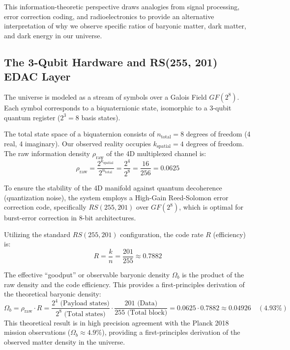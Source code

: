 This information-theoretic perspective draws analogies from signal processing, error correction coding, and radioelectronics to provide an alternative interpretation of why we observe specific ratios of baryonic matter, dark matter, and dark energy in our universe.

\subsection{The 3-Qubit Hardware and RS(255, 201) EDAC Layer}

The universe is modeled as a stream of symbols over a Galois Field $GF(2^8)$. Each symbol corresponds to a biquaternionic state, isomorphic to a 3-qubit quantum register ($2^3=8$ basis states). 

The total state space of a biquaternion consists of $n_{\text{total}} = 8$ degrees of freedom (4 real, 4 imaginary). Our observed reality occupies $k_{\text{spatial}} = 4$ degrees of freedom. The raw information density $\rho_{\text{raw}}$ of the 4D multiplexed channel is:
\begin{equation}
\rho_{\text{raw}} = \frac{2^{k_{\text{spatial}}}}{2^{n_{\text{total}}}} = \frac{2^4}{2^8} = \frac{16}{256} = 0.0625
\end{equation}

To ensure the stability of the 4D manifold against quantum decoherence (quantization noise), the system employs a High-Gain Reed-Solomon error correction code, specifically $RS(255, 201)$ over $GF(2^8)$, which is optimal for burst-error correction in 8-bit architectures. 

Utilizing the standard $RS(255, 201)$ configuration, the code rate $R$ (efficiency) is:
\begin{equation}
R = \frac{k}{n} = \frac{201}{255} \approx 0.7882
\end{equation}

The effective ``goodput'' or observable baryonic density $\Omega_b$ is the product of the raw density and the code efficiency. This provides a first-principles derivation of the theoretical baryonic density:
\begin{equation}
\Omega_b = \rho_{\text{raw}} \cdot R = \frac{2^4 \text{ (Payload states)}}{2^8 \text{ (Total states)}} \cdot \frac{201 \text{ (Data)}}{255 \text{ (Total block)}} = 0.0625 \cdot 0.7882 \approx 0.04926 \quad (\mathbf{4.93\%})
\end{equation}
This theoretical result is in high precision agreement with the Planck 2018 mission observations ($\Omega_b \approx 4.9\%$), providing a first-principles derivation of the observed matter density in the universe.

